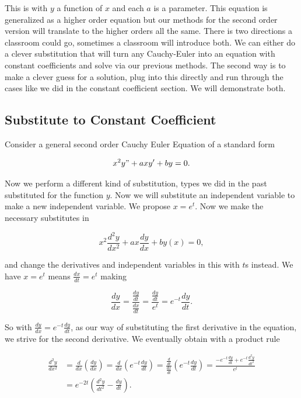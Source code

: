 \documentclass[12pt]{article}
\begin{document}
This is with $y$ a function of $x$ and each $a$ is a parameter. This equation is generalized as a higher order equation but our methods for the second order version will translate to the higher orders all the same. There is two directions a classroom could go, sometimes a classroom will introduce both. We can either do a clever substitution that will turn any Cauchy-Euler into an equation with constant coefficients and solve via our previous methods. The second way is to make a clever guess for a solution, plug into this directly and run through the cases like we did in the constant coefficient section. We will demonstrate both.

\subsection{Substitute to Constant Coefficient}

Consider a general second order Cauchy Euler Equation of a standard form

\begin{equation*}
    x^2y"+axy'+by=0.
\end{equation*}

Now we perform a different kind of substitution, types we did in the past substituted for the function $y$. Now we will substitute an independent variable to make a new independent variable. We propose $x=e^t$. Now we make the necessary substitutes in

\begin{equation*}
    x^2\frac{d^2y}{dx^2}+ax\frac{dy}{dx}+by(x)=0,
\end{equation*}

and change the derivatives and independent variables in this with $t$s instead. We have $x=e^t$ means $\frac{dx}{dt}=e^t$ making

\begin{equation*}
    \frac{dy}{dx}=\frac{\frac{dy}{dt}}{\frac{dx}{dt}}=\frac{\frac{dy}{dt}}{e^t}=e^{-t}\frac{dy}{dt}.
\end{equation*}

So with $\frac{dy}{dx}=e^{-t}\frac{dy}{dt}$, as our way of substituting the first derivative in the equation, we strive for the second derivative. We  eventually obtain with a product rule

\begin{align*}
    \frac{d^2y}{dx^2}&=\frac{d}{dx}\left(\frac{dy}{dx}\right)=\frac{d}{dx}\left(e^{-t}\frac{dy}{dt}\right)=\frac{\frac{d}{dt}}{\frac{dx}{dt}}\left(e^{-t}\frac{dy}{dt}\right)=\frac{-e^{-t}\frac{dy}{dt}+e^{-t}\frac{d^2y}{dt^2}}{e^t} \\
    &=e^{-2t}\left(\frac{d^2y}{dt^2}-\frac{dy}{dt}\right).
\end{align*}
\end{document}

